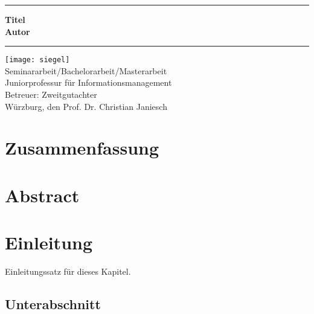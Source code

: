 \documentclass[12pt,oneside]{article}
\newcommand{\JMUTitle}[9]{

  \thispagestyle{empty}
  \vspace*{\stretch{1}}
  {\parindent0cm
  \rule{\linewidth}{.7ex}}
  \begin{flushright}
    \vspace*{\stretch{1}}
    \sffamily\bfseries\Huge
    #1\\
    \vspace*{\stretch{1}}
    \sffamily\bfseries\large
    #2
    \vspace*{\stretch{1}}
  \end{flushright}
  \rule{\linewidth}{.7ex}

  \vspace*{\stretch{1}}
  \begin{center}
    \texttt{[image: siegel]} \\
    \vspace*{\stretch{1}}
    \Large Seminararbeit/Bachelorarbeit/Masterarbeit  \\

    \vspace*{\stretch{2}}
   \large Juniorprofessur f\"{u}r Informationsmanagement\\
    \vspace*{\stretch{1}}
    \large Betreuer:  #7 \\[1mm]
    
    \vspace*{\stretch{1}}
    \large W\"urzburg, den #6
  \end{center}
}
\begin{document}
  \JMUTitle
      {Titel }        %
      {Autor}                        %
      
      {Wirtschaftswissenschaftlichen Fakultät}  %
      {W"urzburg 2018}                          %
      {dd.mm.yyyy}                              %
      {Prof. Dr. Christian Janiesch}               %
      {Zweitgutachter}                          %
      {Pr"ufungsdatum}                          %

  \clearpage

\lhead{}
    \setcounter{page}{1}

\tableofcontents
\clearpage

\listoffigures

\listoftables
\clearpage

\section*{Zusammenfassung}
\blindtext
\clearpage

\section*{Abstract}
\blindtext



\cleardoublepage
{}  
    \setcounter{page}{1}
\lhead{\nouppercase{\leftmark}}


\section{Einleitung} \label{einleitung}

Einleitungssatz für dieses Kapitel.

\subsection{Unterabschnitt}
\end{document}
